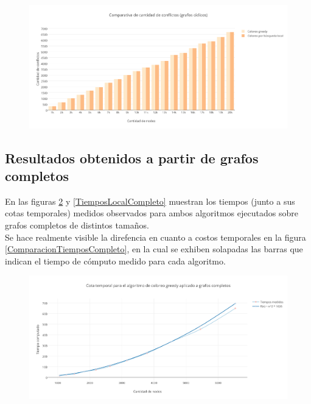  \begin{figure}[H]
    \centering
  	\includegraphics[width=18cm]{imagenes/Ej5/ComparacionConflictosCiclico.png}
    \caption{}
 	  \label{ComparacionConflictosCiclico}
  \end{figure}


\subsection {Resultados obtenidos a partir de grafos completos}

En las figuras \ref{TiempoGreedyCompleto} y \ref{TiemposLocalCompleto} muestran los tiempos (junto a sus cotas temporales) medidos observados para ambos algoritmos ejecutados sobre grafos completos de distintos tamaños.\\
Se hace realmente visible la direfencia en cuanto a costos temporales en la figura \ref{ComparacionTiemposCompleto}, en la cual se exhiben solapadas las barras que indican el tiempo de cómputo medido para cada algoritmo.

 \begin{figure}[H]
    \centering
  	\includegraphics[width=18cm]{imagenes/Ej5/TiempoGreedyCompleto.png}
    \caption{}
 	  \label{TiempoGreedyCompleto}
  \end{figure}

